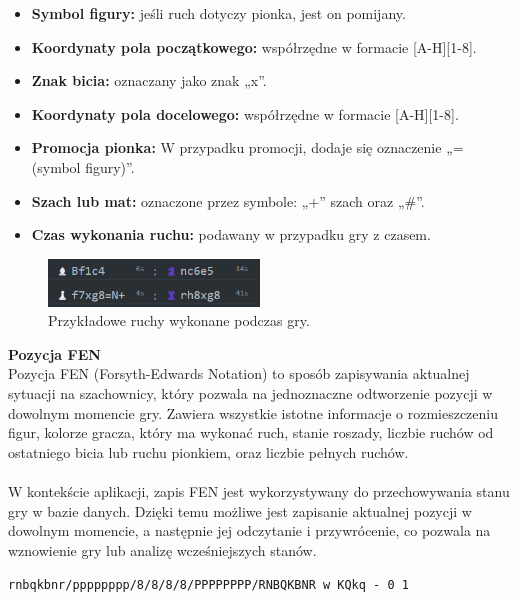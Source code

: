 \documentclass[twoside]{projektInzynierskiMS1}
\begin{document}
\begin{itemize}
    \item \textbf{Symbol figury:} jeśli ruch dotyczy pionka, jest on pomijany.
    \item \textbf{Koordynaty pola początkowego:} współrzędne w formacie [A-H][1-8].
    \item \textbf{Znak bicia:} oznaczany jako znak „x”.
    \item \textbf{Koordynaty pola docelowego:} współrzędne w formacie [A-H][1-8].
    \item \textbf{Promocja pionka:} W przypadku promocji, dodaje się oznaczenie „=(symbol figury)”.
    \item \textbf{Szach lub mat:} oznaczone przez symbole: „+” szach oraz „\#”.
    \item \textbf{Czas wykonania ruchu:} podawany w przypadku gry z czasem.
\end{itemize}

\vspace{0.5cm}
\begin{figure}[h!]
    \centering
    \includegraphics[width=0.5\textwidth]{images/imp_moves.png}
    \caption{Przykładowe ruchy wykonane podczas gry.}
\end{figure}
\vspace{0.5cm}

\noindent \textbf{Pozycja FEN}\\
Pozycja FEN (Forsyth-Edwards Notation) to sposób zapisywania aktualnej sytuacji na szachownicy, który pozwala na jednoznaczne odtworzenie pozycji w dowolnym momencie gry. Zawiera wszystkie istotne informacje o rozmieszczeniu figur, kolorze gracza, który ma wykonać ruch, stanie roszady, liczbie ruchów od ostatniego bicia lub ruchu pionkiem, oraz liczbie pełnych ruchów.
\\\\
W kontekście aplikacji, zapis FEN jest wykorzystywany do przechowywania stanu gry w bazie danych. Dzięki temu możliwe jest zapisanie aktualnej pozycji w dowolnym momencie, a następnie jej odczytanie i przywrócenie, co pozwala na wznowienie gry lub analizę wcześniejszych stanów.

\begin{center}
    \texttt{rnbqkbnr/pppppppp/8/8/8/8/PPPPPPPP/RNBQKBNR w KQkq - 0 1}
\end{center}
\end{document}

